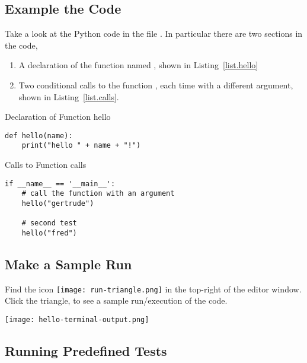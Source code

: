 \subsection{Example the Code}
Take a look at the Python code in the file .  In particular there are two sections in the code, 
\begin{enumerate}
\item A declaration of the function named , shown in Listing~\ref{list.hello}
\item Two conditional calls to the function , each time with a different argument, shown in Listing~\ref{list.calls}.
\end{enumerate}

\begin{listing}{Declaration of Function }{hello}
\begin{minipage}[c]{0.95\textwidth}\begin{lstlisting}
def hello(name):
    print("hello " + name + "!")
\end{lstlisting}\end{minipage}\end{listing}

\begin{listing}{Calls to Function }{calls}
\begin{minipage}[c]{0.95\textwidth}\begin{lstlisting}
if __name__ == '__main__':
    # call the function with an argument
    hello("gertrude")
    
    # second test
    hello("fred")
\end{lstlisting}\end{minipage}\end{listing}


\subsection{Make a Sample Run}

Find the icon \texttt{[image: run-triangle.png]}
  in the top-right of the editor window.  Click the triangle, to see a sample run/execution of the code.

\noindent\texttt{[image: hello-terminal-output.png]}


\subsection{Running Predefined Tests}

